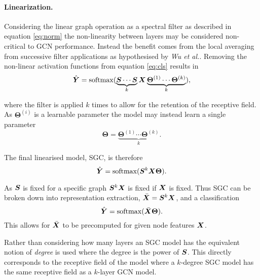 \paragraph{Linearization.}
Considering the linear graph operation as a spectral filter as described in equation \ref{eq:norm} the non-linearity between layers may be considered non-critical to GCN performance.
Instead the benefit comes from the local averaging from successive filter applications as hypothesised by \textit{Wu et al.}.
Removing the non-linear activation functions from equation \ref{eq:cls} results in
\begin{equation}
    \hat{{\bm{Y}}} = \operatorname{softmax}(\underbrace{{\bm{S}}\cdots{\bm{S}}}_k{\bm{X}}\underbrace{\bm{\Theta}^{(1)}\cdots\bm{\Theta}^{(k)}}_k),
\end{equation}

where the filter is applied $k$ times to allow for the retention of the receptive field.
As $\bm{\Theta}^{(i)}$ is a learnable parameter the model may instead learn a single parameter
\begin{equation}
    \label{eq:theta}
    \bm{\Theta} = \underbrace{\bm{\Theta}^{(1)}\cdots\bm{\Theta}^{(k)}}_k.
\end{equation}

The final linearised model, SGC, is therefore
\begin{equation}
    \hat{{\bm{Y}}} = \operatorname{softmax}({\bm{S}}^{k}{\bm{X}}\bm{\Theta}).
\end{equation}

As ${\bm{S}}$ is fixed for a specific graph ${\bm{S}}^k{\bm{X}}$ is fixed if ${\bm{X}}$ is fixed.
Thus SGC can be broken down into representation extraction, $\bar{{\bm{X}}} = {\bm{S}}^k{\bm{X}}$, and a classification
\begin{equation}
    \label{eq:SGC}
    \hat{{\bm{Y}}} = \operatorname{softmax}(\bar{{\bm{X}}}\bm{\Theta}).
\end{equation}
This allows for $\bar{{\bm{X}}}$ to be precomputed for given node features ${\bm{X}}$.

Rather than considering how many layers an SGC model has the equivalent notion of \emph{degree} is used where the degree is the power of ${\bm{S}}$.
This directly corresponds to the receptive field of the model where a $k$-degree SGC model has the same receptive field as a $k$-layer GCN model.

